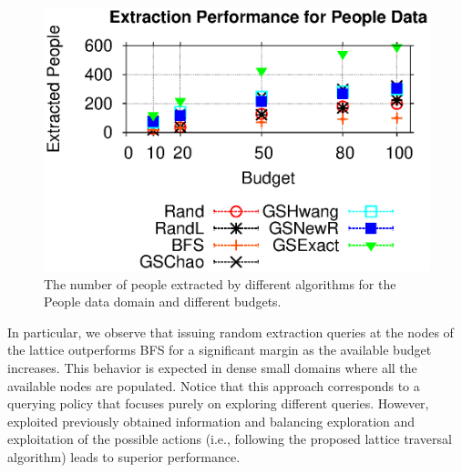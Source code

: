 \vspace{-10pt}\begin{figure}[h]
	\begin{center}
	\includegraphics[clip,scale=0.6]{figs/poExtraction.eps}
	\caption{The number of people extracted by different algorithms for the People data domain and different budgets.}
	\label{fig:poextraction}
	\end{center}
	\vspace{-10pt}
\end{figure}

In particular, we observe that issuing random extraction queries at the nodes of the lattice outperforms BFS for a significant margin as the available budget increases. This behavior is expected in dense small domains where all the available nodes are populated. Notice that this approach corresponds to a querying policy that focuses purely on exploring different queries. However, exploited previously obtained information and balancing exploration and exploitation of the possible actions (i.e., following the proposed lattice traversal algorithm) leads to superior performance. 



